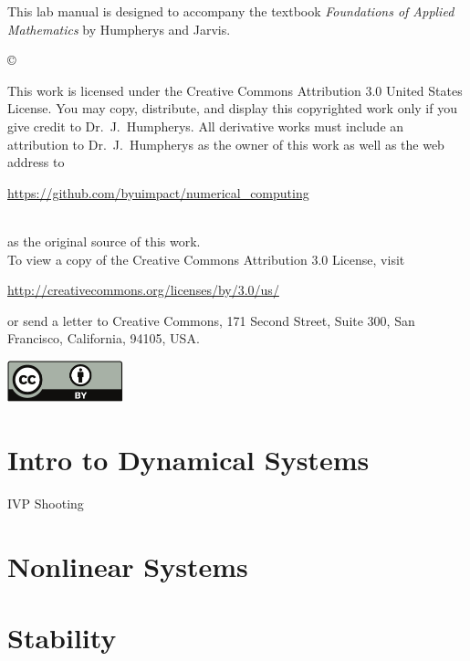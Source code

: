 \documentclass[nociteref]{newsiambook}
\begin{document}
\begin{thepreface}
This lab manual is designed to accompany the textbook \emph{Foundations of Applied Mathematics} by Humpherys and Jarvis.

\vfill
\copyright{This work is licensed under the Creative Commons Attribution 3.0 United States 
License.  You may copy, distribute, and display this copyrighted work only if you give 
credit to Dr.~J.~Humpherys. All derivative works must include an attribution to Dr.~J.~Humpherys as the owner of this work as well as the web address to 
\\\centerline{\url{https://github.com/byuimpact/numerical_computing}}\\ as the original source of 
this 
work.\\To view a copy of the Creative Commons Attribution 3.0 License, 
visit\\\centerline{\url{http://creativecommons.org/licenses/by/3.0/us/}} or send a letter to 
Creative Commons, 171 Second Street, Suite 300, San Francisco, California, 94105, USA.}

\vfill
\centering\includegraphics[height=1.2cm]{by}
\vfill
\end{thepreface}

\setcounter{tocdepth}{1}
\tableofcontents

\mainmatter

\part{Intro to Dynamical Systems}
{IVP}
{Shooting}

\part{Nonlinear Systems}

\part{Stability}
\end{document}
